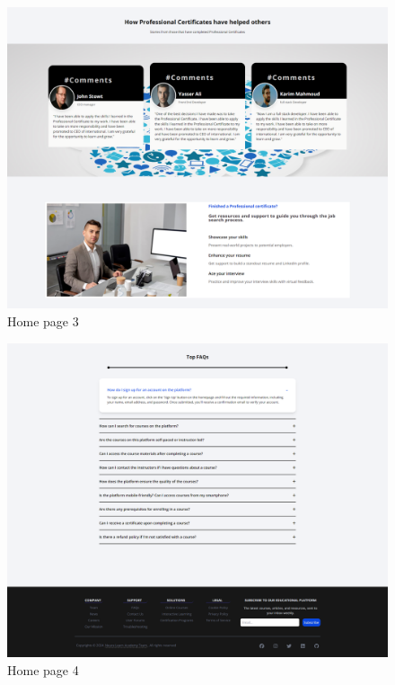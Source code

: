 \begin{figure}[h!]
	\centering
	\includegraphics[max height=\textheight,max width=\textwidth]{figures/frontend/Homepage3.png}
	\caption{Home page 3}
\end{figure}

\begin{figure}[h!]
	\centering
	\includegraphics[max height=\textheight,max width=\textwidth]{figures/frontend/Homepage4.png}
	\caption{Home page 4}
\end{figure}

